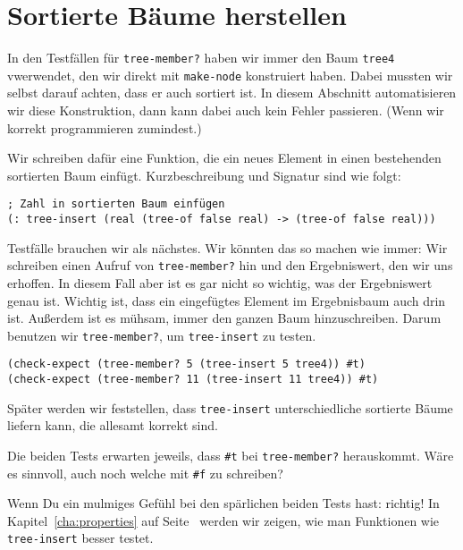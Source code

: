 \section{Sortierte Bäume herstellen}

In den Testfällen für \lstinline{tree-member?} haben wir immer den
Baum \lstinline{tree4} vwerwendet, den wir direkt mit
\lstinline{make-node} konstruiert haben.  Dabei mussten wir selbst
darauf achten, dass er auch sortiert ist.  In diesem Abschnitt
automatisieren wir diese Konstruktion, dann kann dabei auch kein
Fehler passieren.  (Wenn wir korrekt programmieren zumindest.)

Wir schreiben dafür eine Funktion, die ein neues Element in einen
bestehenden sortierten Baum einfügt.  Kurzbeschreibung und Signatur
sind wie folgt:
%
\begin{lstlisting}
; Zahl in sortierten Baum einfügen 
(: tree-insert (real (tree-of false real) -> (tree-of false real)))
\end{lstlisting}
%
Testfälle brauchen wir als nächstes.  Wir könnten das so machen wie
immer: Wir schreiben einen Aufruf von \lstinline{tree-member?} hin und
den Ergebniswert, den wir uns erhoffen.  In diesem Fall aber ist es
gar nicht so wichtig, was der Ergebniswert genau ist.  Wichtig ist,
dass ein eingefügtes Element im Ergebnisbaum auch drin ist.  Außerdem
ist es mühsam, immer den ganzen Baum hinzuschreiben.  Darum benutzen
wir \lstinline{tree-member?}, um \lstinline{tree-insert} zu testen.
%
\begin{lstlisting}
(check-expect (tree-member? 5 (tree-insert 5 tree4)) #t)
(check-expect (tree-member? 11 (tree-insert 11 tree4)) #t)
\end{lstlisting}
%
Später werden wir feststellen, dass \lstinline{tree-insert}
unterschiedliche sortierte Bäume liefern kann, die allesamt korrekt
sind.
%
\begin{aufgabeinline}
  Die beiden Tests erwarten jeweils, dass \lstinline{#t} bei
  \lstinline{tree-member?} herauskommt.  Wäre es sinnvoll, auch noch
  welche mit \lstinline{#f} zu schreiben?
\end{aufgabeinline}
%
Wenn Du ein mulmiges Gefühl bei den spärlichen beiden Tests hast:
richtig!  In Kapitel~\ref{cha:properties} auf
Seite~\pageref{cha:properties} werden wir zeigen, wie man Funktionen
wie \lstinline{tree-insert} besser testet.

